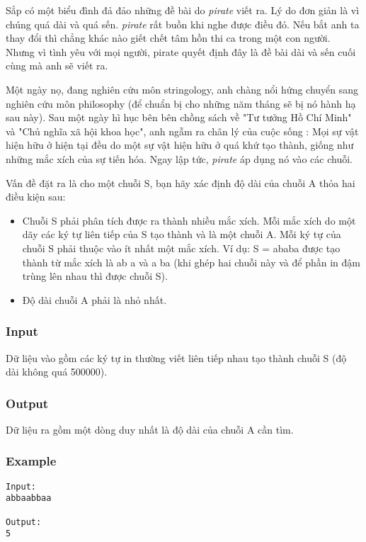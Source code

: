 



   Sắp có một biểu đình đả đảo những đề bài do       \textit{     pirate    }      viết ra. Lý do đơn giản là vì chúng quá dài và quá sến.   \textit{    pirate   }   rất buồn khi nghe được điều đó. Nếu bắt anh ta thay đổi thì chẳng khác nào giết chết tâm hồn thi ca trong một con người. Nhưng vì tình yêu với mọi người, pirate quyết định đây là đề bài dài và sến cuối cùng mà anh sẽ viết ra.  

   Một ngày nọ, đang nghiên cứu môn stringology, anh chàng nổi hứng chuyển sang nghiên cứu môn philosophy (để chuẩn bị cho những năm tháng sẽ bị nó hành hạ sau này). Sau một ngày hì hục bên bên chồng sách về "Tư tưởng Hồ Chí Minh" và "Chủ nghĩa xã hội khoa học", anh ngẫm ra chân lý của cuộc sống : Mọi sự vật hiện hữu ở hiện tại đều do một sự vật hiện hữu ở quá khứ tạo thành, giống như những mắc xích của sự tiến hóa. Ngay lập tức,   \textit{    pirate   }   áp dụng nó vào các chuỗi.  

   Vấn đề đặt ra là cho một chuỗi S, bạn hãy xác định độ dài của chuỗi A thỏa hai điều kiện sau:  
\begin{itemize}
	\item     Chuỗi S phải phân tích được ra thành nhiều mắc xích. Mỗi mắc xích do một dãy các ký tự liên tiếp của S tạo thành và là một chuỗi A. Mỗi ký tự của chuỗi S phải thuộc vào ít nhất một mắc xích. Ví dụ: S = ababa được tạo thành từ mắc xích là ab         a        và         a        ba (khi ghép hai chuỗi này và để phần in đậm trùng lên nhau thì được chuỗi S).   
	\item     Độ dài chuỗi A phải là nhỏ nhất.   
\end{itemize}

\subsubsection{   Input  }

   Dữ liệu vào gồm các ký tự in thường viết liên tiếp nhau tạo thành chuỗi S (độ dài không quá 500000).  

\subsubsection{   Output  }

   Dữ liệu ra gồm một dòng duy nhất là độ dài của chuỗi A cần tìm.  

\subsubsection{   Example  }
\begin{verbatim}
Input:
abbaabbaa

Output:
5
\end{verbatim}